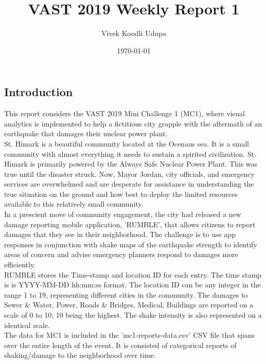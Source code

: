 \documentclass[12pt]{extarticle}
\title{VAST 2019 Weekly Report 1}
\author{Vivek Koodli Udupa}
\date{\today}
\begin{document}
\maketitle

\begin{centering}
	\section{Introduction}
\end{centering} \noindent
This report considers the VAST 2019 Mini Challenge 1 (MC1), where visual analytics is implemented to help a fictitious city grapple with the aftermath of an earthquake that damages their nuclear power plant. \\

St. Himark is a beautiful community located at the Ocenaus sea. It is a small community with almost everything it needs to sustain a spirited civilization. St. Himark is primarily powered by the Always Safe Nuclear Power Plant. This was true until the disaster struck. Now, Mayor Jordan, city officials, and emergency services are overwhelmed and are desperate for assistance in understanding the true situation on the ground and how best to deploy the limited resources available to this relatively small community. \\

In a prescient move of community engagement, the city had released a new damage reporting mobile application, 'RUMBLE', that allows citizens to report damages that they see in their neighborhood. The challenge is to use app responses in conjunction with shake maps of the earthquake strength to identify areas of concern and advise emergency planners respond to damages more efficiently. \\

RUMBLE stores the Time-stamp and location ID for each entry. The time stamp is is YYYY-MM-DD hh:mm:ss format. The location ID can be any integer in the range 1 to 19, representing different cities in the community. The damages to Sewer \& Water, Power, Roads \& Bridges, Medical, Buildings are reported on a scale of 0 to 10, 10 being the highest. The shake intensity is also represented on a identical scale. \\

The data for MC1 is included in the 'mc1-reports-data.csv' CSV file that spans over the entire length of the event. It is consisted of categorical reports of shaking/damage to the neighborhood over time. \\
\end{document}
